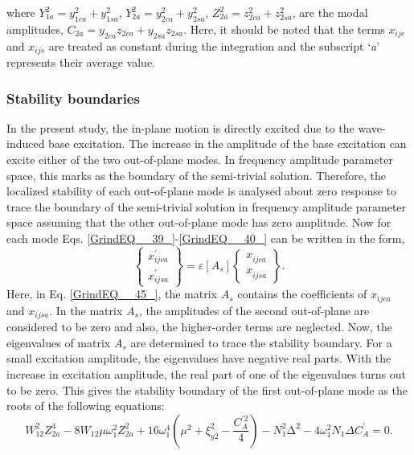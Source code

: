 \documentclass[review]{elsarticle}
\begin{document}
where $Y^2_{1a}=y^2_{1ca}+y^2_{1sa}$, $Y^2_{2a}=y^2_{2ca}+y^2_{2sa}$, $Z^2_{2a}=z^2_{2ca}+z^2_{2sa}$, are the modal amplitudes, $C_{2a}=y_{2ca}z_{2ca}+y_{2sa}z_{2sa}$. Here, it should be noted that the terms $x_{ijc}$ and $x_{ijs}$ are treated as constant during the integration and the subscript `\textit{a}' represents their average value.
\subsubsection{Stability boundaries}
In the present study, the in-plane motion is directly excited due to the wave-induced base excitation. The increase in the amplitude of the base excitation can excite either of the two out-of-plane modes. In frequency amplitude parameter space, this marks as the boundary of the semi-trivial solution. Therefore, the localized stability of each out-of-plane mode is analysed about zero response to trace the boundary of the semi-trivial solution in frequency amplitude parameter space assuming that the other out-of-plane mode has zero amplitude. Now for each mode Eqs. \eqref{GrindEQ__39_}-\eqref{GrindEQ__40_} can be written in the form,
\begin{equation} \label{GrindEQ__45_} 
\left\{ \begin{array}{c}
x^{'}_{ijca} \\ 
x^{'}_{ijsa} \end{array}
\right\}=\varepsilon \left[A_s\right]\left\{ \begin{array}{c}
x^{\ }_{ijca} \\ 
x^{\ }_{ijsa} \end{array}
\right\}.              
\end{equation} 
Here, in Eq. \eqref{GrindEQ__45_}, the matrix $A_s$ contains the coefficients of $x_{ijca}$ and $x_{ijsa}$. In the matrix $A_s$, the amplitudes of the second out-of-plane are considered to be zero and also, the higher-order terms are neglected. Now, the eigenvalues of matrix $A_s$ are determined to trace the stability boundary. For a small excitation amplitude, the eigenvalues have negative real parts. With the increase in excitation amplitude, the real part of one of the eigenvalues turns out to be zero. This gives the stability boundary of the first out-of-plane mode as the roots of the following equations:
\begin{equation} \label{GrindEQ__46_} 
W^2_{12}Z^4_{2a}-8W_{12}\mu {\omega }^2_1Z^2_{2a}+16{\omega }^4_1\left({\mu }^2+{\xi }^2_{y2}-\frac{C^{'2}_A}{4}\right)-N^2_1{\mathrm{\Delta }}^2-4{\omega }^2_1N_1\Delta C^{'}_A=0.   
\end{equation} 
\end{document}
